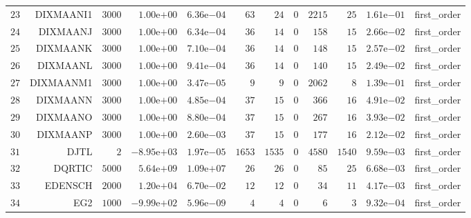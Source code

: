 \begin{longtable}{rrrrrrrrrrrr}
  \(    23\) & DIXMAANI1 & \(  3000\) & \( 1.00\)e\(+00\) & \( 6.36\)e\(-04\) & \(    63\) & \(    24\) & \(     0\) & \(  2215\) & \(    25\) & \( 1.61\)e\(-01\) & first\_order \\
  \(    24\) & DIXMAANJ & \(  3000\) & \( 1.00\)e\(+00\) & \( 6.34\)e\(-04\) & \(    36\) & \(    14\) & \(     0\) & \(   158\) & \(    15\) & \( 2.66\)e\(-02\) & first\_order \\
  \(    25\) & DIXMAANK & \(  3000\) & \( 1.00\)e\(+00\) & \( 7.10\)e\(-04\) & \(    36\) & \(    14\) & \(     0\) & \(   148\) & \(    15\) & \( 2.57\)e\(-02\) & first\_order \\
  \(    26\) & DIXMAANL & \(  3000\) & \( 1.00\)e\(+00\) & \( 9.41\)e\(-04\) & \(    36\) & \(    14\) & \(     0\) & \(   140\) & \(    15\) & \( 2.49\)e\(-02\) & first\_order \\
  \(    27\) & DIXMAANM1 & \(  3000\) & \( 1.00\)e\(+00\) & \( 3.47\)e\(-05\) & \(     9\) & \(     9\) & \(     0\) & \(  2062\) & \(     8\) & \( 1.39\)e\(-01\) & first\_order \\
  \(    28\) & DIXMAANN & \(  3000\) & \( 1.00\)e\(+00\) & \( 4.85\)e\(-04\) & \(    37\) & \(    15\) & \(     0\) & \(   366\) & \(    16\) & \( 4.91\)e\(-02\) & first\_order \\
  \(    29\) & DIXMAANO & \(  3000\) & \( 1.00\)e\(+00\) & \( 8.80\)e\(-04\) & \(    37\) & \(    15\) & \(     0\) & \(   267\) & \(    16\) & \( 3.93\)e\(-02\) & first\_order \\
  \(    30\) & DIXMAANP & \(  3000\) & \( 1.00\)e\(+00\) & \( 2.60\)e\(-03\) & \(    37\) & \(    15\) & \(     0\) & \(   177\) & \(    16\) & \( 2.12\)e\(-02\) & first\_order \\
  \(    31\) & DJTL & \(     2\) & \(-8.95\)e\(+03\) & \( 1.97\)e\(-05\) & \(  1653\) & \(  1535\) & \(     0\) & \(  4580\) & \(  1540\) & \( 9.59\)e\(-03\) & first\_order \\
  \(    32\) & DQRTIC & \(  5000\) & \( 5.64\)e\(+09\) & \( 1.09\)e\(+07\) & \(    26\) & \(    26\) & \(     0\) & \(    85\) & \(    25\) & \( 6.68\)e\(-03\) & first\_order \\
  \(    33\) & EDENSCH & \(  2000\) & \( 1.20\)e\(+04\) & \( 6.70\)e\(-02\) & \(    12\) & \(    12\) & \(     0\) & \(    34\) & \(    11\) & \( 4.17\)e\(-03\) & first\_order \\
  \(    34\) & EG2 & \(  1000\) & \(-9.99\)e\(+02\) & \( 5.96\)e\(-09\) & \(     4\) & \(     4\) & \(     0\) & \(     6\) & \(     3\) & \( 9.32\)e\(-04\) & first\_order \\

\end{longtable}
